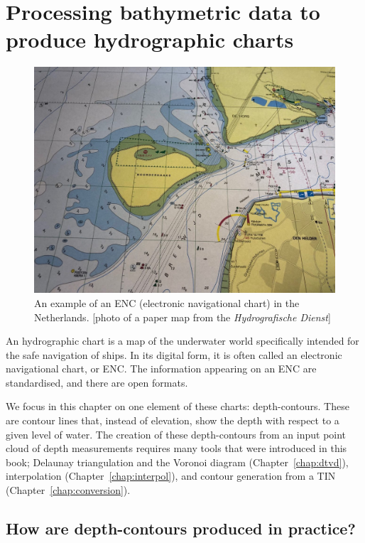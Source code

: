 
\graphicspath{{bathymetry/}}

\chapter{Processing bathymetric data to produce hydrographic charts}
\label{chap:bathymetry}

\begin{figure}[h]
  \centering
  \includegraphics[width=0.8\linewidth]{figs/enc_denhelder.jpeg}
  \caption{An example of an ENC (electronic navigational chart) in the Netherlands. [photo of a paper map from the \emph{Hydrografische Dienst}]}
\label{fig:enc.jpg}
\end{figure}

An hydrographic chart is a map of the underwater world specifically intended for the safe navigation of ships.
In its digital form, it is often called an electronic navigational chart, or ENC.
The information appearing on an ENC are standardised, and there are open formats.

%

We focus in this chapter on one element of these charts: depth-contours.
These are contour lines that, instead of elevation, show the depth with respect to a given level of water.
The creation of these depth-contours from an input point cloud of depth measurements requires many tools that were introduced in this book; Delaunay triangulation and the Voronoi diagram (Chapter~\ref{chap:dtvd}), interpolation (Chapter~\ref{chap:interpol}), and contour generation from a TIN (Chapter~\ref{chap:conversion}).


%
\section{How are depth-contours produced in practice?}

